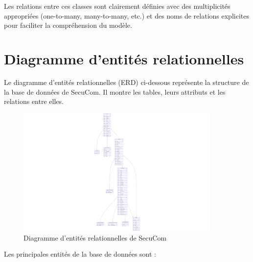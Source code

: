 Les relations entre ces classes sont clairement définies avec des multiplicités appropriées (one-to-many, many-to-many, etc.) et des noms de relations explicites pour faciliter la compréhension du modèle.

\section{Diagramme d'entités relationnelles}

Le diagramme d'entités relationnelles (ERD) ci-dessous représente la structure de la base de données de SecuCom. Il montre les tables, leurs attributs et les relations entre elles.

\begin{figure}[h]
\centering
\includegraphics[width=0.9\textwidth]{ERD.png}
\caption{Diagramme d'entités relationnelles de SecuCom}
\end{figure}

Les principales entités de la base de données sont :


